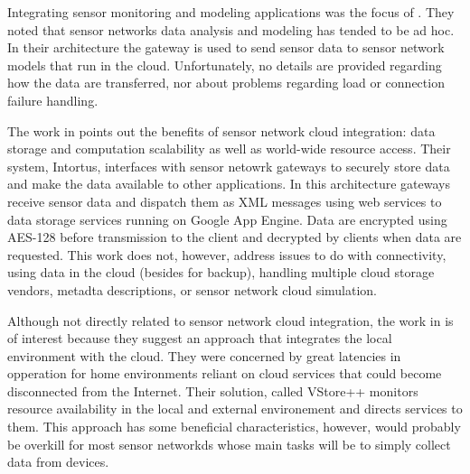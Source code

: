 Integrating sensor monitoring and modeling applications was the focus of \cite{5678063}. They noted that sensor networks data analysis and modeling has tended to be ad hoc. In their architecture the gateway is used to send sensor data to sensor network models that run in the cloud. Unfortunately, no details are provided regarding how the data are transferred, nor about problems regarding load or connection failure handling.

The work in \cite{Patil2011} points out the benefits of sensor network cloud integration: data storage and computation scalability as well as world-wide resource access. Their system, Intortus, interfaces with sensor netowrk gateways to securely store data and make the data available to other applications. In this architecture gateways receive sensor data and dispatch them as XML messages using web services to data storage services running on Google App Engine. Data are encrypted using AES-128 before transmission to the client and decrypted by clients when data are requested. This work does not, however, address issues to do with connectivity, using data in the cloud (besides for backup), handling multiple cloud storage vendors, metadta descriptions, or sensor network cloud simulation.

Although not directly related to sensor network cloud integration, the work in \cite{5961767} is of interest because they suggest an approach that integrates the local environment with the cloud. They were concerned by great latencies in opperation for home environments reliant on cloud services that could become disconnected from the Internet. Their solution, called VStore++ monitors resource availability in the local and external environement and directs services to them. This approach has some beneficial characteristics, however, would probably be overkill for most sensor networkds whose main tasks will be to simply collect data from devices.

